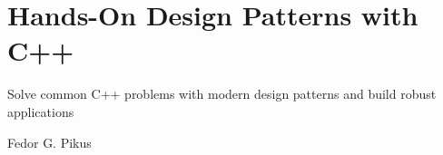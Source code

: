 
\protect{}\label{B19262_FM.xhtml}{}

\section{Hands-On Design Patterns with C++}

Solve common C++ problems with modern design patterns and build robust applications

Fedor G. Pikus


